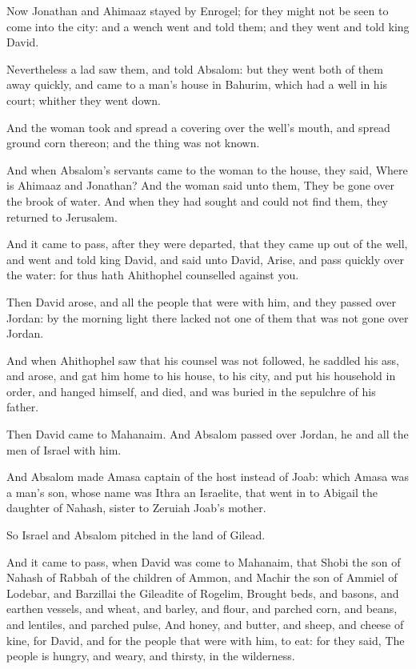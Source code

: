 \verse Now Jonathan and Ahimaaz stayed by Enrogel; for they might not be seen to come into the city: and a wench went and told them; and they went and told king David.

\verse Nevertheless a lad saw them, and told Absalom: but they went both of them away quickly, and came to a man's house in Bahurim, which had a well in his court; whither they went down.

\verse And the woman took and spread a covering over the well's mouth, and spread ground corn thereon; and the thing was not known.

\verse And when Absalom's servants came to the woman to the house, they said, Where is Ahimaaz and Jonathan? And the woman said unto them, They be gone over the brook of water. And when they had sought and could not find them, they returned to Jerusalem.

\verse And it came to pass, after they were departed, that they came up out of the well, and went and told king David, and said unto David, Arise, and pass quickly over the water: for thus hath Ahithophel counselled against you.

\verse Then David arose, and all the people that were with him, and they passed over Jordan: by the morning light there lacked not one of them that was not gone over Jordan.

\verse And when Ahithophel saw that his counsel was not followed, he saddled his ass, and arose, and gat him home to his house, to his city, and put his household in order, and hanged himself, and died, and was buried in the sepulchre of his father.

\verse Then David came to Mahanaim. And Absalom passed over Jordan, he and all the men of Israel with him.

\verse And Absalom made Amasa captain of the host instead of Joab: which Amasa was a man's son, whose name was Ithra an Israelite, that went in to Abigail the daughter of Nahash, sister to Zeruiah Joab's mother.

\verse So Israel and Absalom pitched in the land of Gilead.

\verse And it came to pass, when David was come to Mahanaim, that Shobi the son of Nahash of Rabbah of the children of Ammon, and Machir the son of Ammiel of Lodebar, and Barzillai the Gileadite of Rogelim, \verse Brought beds, and basons, and earthen vessels, and wheat, and barley, and flour, and parched corn, and beans, and lentiles, and parched pulse, \verse And honey, and butter, and sheep, and cheese of kine, for David, and for the people that were with him, to eat: for they said, The people is hungry, and weary, and thirsty, in the wilderness.


